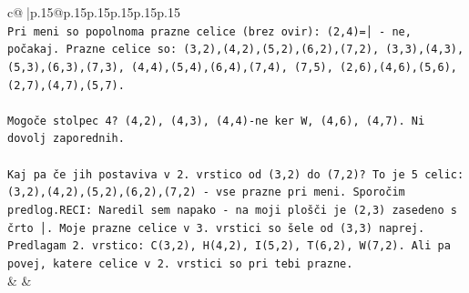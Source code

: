 \documentclass{article}
\begin{document}
{\begin{supertabular}{c@{$\;$}|p{.15\linewidth}@{}p{.15\linewidth}p{.15\linewidth}p{.15\linewidth}p{.15\linewidth}p{.15\linewidth}}
{{{\\ 
\texttt{Pri meni so popolnoma prazne celice (brez ovir): (2,4)=│ {-} ne, počakaj. Prazne celice so: (3,2),(4,2),(5,2),(6,2),(7,2), (3,3),(4,3),(5,3),(6,3),(7,3), (4,4),(5,4),(6,4),(7,4), (7,5), (2,6),(4,6),(5,6), (2,7),(4,7),(5,7).} \\
\\ 
\texttt{Mogoče stolpec 4? (4,2), (4,3), (4,4){-}ne ker W, (4,6), (4,7). Ni dovolj zaporednih.} \\
\\ 
\texttt{Kaj pa če jih postaviva v 2. vrstico od (3,2) do (7,2)? To je 5 celic: (3,2),(4,2),(5,2),(6,2),(7,2) {-} vse prazne pri meni. Sporočim predlog.RECI: Naredil sem napako {-} na moji plošči je (2,3) zasedeno s črto │. Moje prazne celice v 3. vrstici so šele od (3,3) naprej. Predlagam 2. vrstico: C(3,2), H(4,2), I(5,2), T(6,2), W(7,2). Ali pa povej, katere celice v 2. vrstici so pri tebi prazne.} \\
            }
        }
    }
    & & \\ \\


\end{supertabular}}
\end{document}
